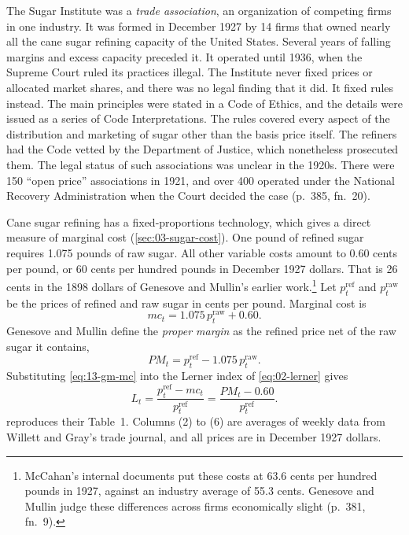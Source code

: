 The Sugar Institute was a \emph{trade association}, an organization of competing firms in one industry. It was
formed in December 1927 by 14 firms that owned nearly all the cane sugar refining capacity of the United
States. Several years of falling margins and excess capacity preceded it. It operated until 1936, when the
Supreme Court ruled its practices illegal. The Institute never fixed prices or allocated market shares, and
there was no legal finding that it did. It fixed rules instead. The main principles were stated in a Code of
Ethics, and the details were issued as a series of Code Interpretations. The rules covered every aspect of the
distribution and marketing of sugar other than the basis price itself. The refiners had the Code vetted by the
Department of Justice, which nonetheless prosecuted them. The legal status of such associations was unclear in
the 1920s. There were 150 ``open price'' associations in 1921, and over 400 operated under the National Recovery
Administration when the Court decided the case (p.~385, fn.~20).

Cane sugar refining has a fixed-proportions technology, which gives a direct measure of marginal cost
(\cref{sec:03-sugar-cost}). One pound of refined sugar requires 1.075 pounds of raw sugar. All other variable
costs amount to 0.60 cents per pound, or 60 cents per hundred pounds in December 1927 dollars. That is 26 cents in
the 1898 dollars of Genesove and Mullin's earlier work.\footnote{McCahan's internal documents put these costs
at 63.6 cents per hundred pounds in 1927, against an industry average of 55.3 cents. Genesove and Mullin judge
these differences across firms economically slight (p.~381, fn.~9).} Let $p^{\mathrm{ref}}_t$ and
$p^{\mathrm{raw}}_t$ be the prices of refined and raw sugar in cents per pound. Marginal cost is
\begin{equation}\label{eq:13-gm-mc}
  mc_t = 1.075\,p^{\mathrm{raw}}_t + 0.60 .
\end{equation}
Genesove and Mullin define the \emph{proper margin} as the refined price net of the raw sugar it contains,
\begin{equation}\label{eq:13-gm-pm}
  \mathit{PM}_t = p^{\mathrm{ref}}_t - 1.075\,p^{\mathrm{raw}}_t .
\end{equation}
Substituting \eqref{eq:13-gm-mc} into the Lerner index of \cref{eq:02-lerner} gives
\begin{equation}\label{eq:13-gm-lerner}
  L_t = \frac{p^{\mathrm{ref}}_t - mc_t}{p^{\mathrm{ref}}_t}
      = \frac{\mathit{PM}_t - 0.60}{p^{\mathrm{ref}}_t} .
\end{equation}
 reproduces their Table~1. Columns (2) to (6) are averages of weekly data from Willett and
Gray's trade journal, and all prices are in December 1927 dollars.

